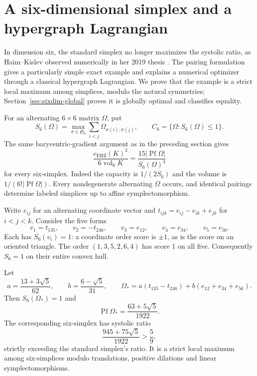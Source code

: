 \section{A six-dimensional simplex and a hypergraph Lagrangian}
\label{sec:sixdim-hypergraph}

In dimension six, the standard simplex no longer maximizes the systolic
ratio, as Haim--Kislev observed numerically in her 2019 thesis
\cite[Remark~1.3]{HaimKislev2019CubesSimplices}. The pairing formulation gives a particularly simple exact example
and explains a numerical optimizer through a classical hypergraph
Lagrangian. We prove that the example is a strict local maximum among simplices,
modulo the natural symmetries; Section~\ref{sec:sixdim-global} proves it is
globally optimal and classifies equality.

For an alternating $6\times6$ matrix $\Omega$, put
\[
 S_6(\Omega)=\max_{\sigma\in\mathfrak S_6}
             \sum_{i<j}\Omega_{\sigma(i),\sigma(j)},\qquad
 C_6=\{\Omega:S_6(\Omega)\le1\}.
\]
The same barycentric-gradient argument as in the preceding section gives
\begin{equation}\label{eq:sixdim-simplex-ratio}
 \frac{c_{\mathrm{EHZ}}(K)^3}{6\operatorname{vol}_6K}
 =\frac{15|\operatorname{Pf}\Omega|}{S_6(\Omega)^3}
\end{equation}
for every six-simplex. Indeed the capacity is $1/(2S_6)$ and the volume
is $1/(6!|\operatorname{Pf}\Omega|)$. Every nondegenerate alternating
$\Omega$ occurs, and identical pairings determine labeled simplices up
to affine symplectomorphism.

Write $e_{ij}$ for an alternating coordinate vector and
$t_{ijk}=e_{ij}-e_{ik}+e_{jk}$ for $i<j<k$. Consider the five forms
\begin{equation}\label{eq:sixdim-five-vertices}
 v_1=t_{135},\qquad v_2=-t_{246},\qquad
 v_3=e_{12},\qquad v_4=e_{34},\qquad v_5=e_{56}.
\end{equation}
Each has $S_6(v_i)=1$: a coordinate order score is $\pm1$, as is the
score on an oriented triangle. The order $(1,3,5,2,6,4)$ has score $1$
on all five. Consequently $S_6=1$ on their entire convex hull.

\begin{theorem}\label{thm:sixdim-golden-local}
Let
\[
 a=\frac{13+3\sqrt5}{62},\qquad b=\frac{6-\sqrt5}{31},\qquad
 \Omega_*=a(t_{135}-t_{246})+b(e_{12}+e_{34}+e_{56}).
\]
Then $S_6(\Omega_*)=1$ and
\[
 \operatorname{Pf}\Omega_* =\frac{63+5\sqrt5}{1922}.
\]
The corresponding six-simplex has systolic ratio
\[
 \frac{945+75\sqrt5}{1922}>\frac59,
\]
strictly exceeding the standard simplex's ratio. It is a strict local
maximum among six-simplices modulo translations, positive dilations
and linear symplectomorphisms.
\end{theorem}

